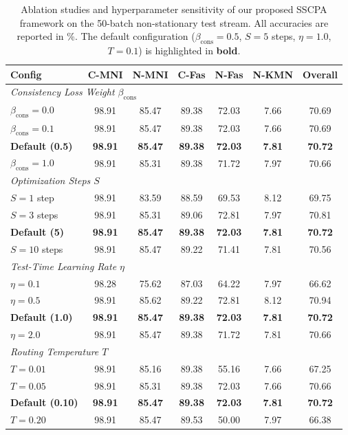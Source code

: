 \documentclass{article}
\theoremstyle{plain}
\theoremstyle{definition}
\theoremstyle{remark}
\begin{document}
\begin{table}[t]
\centering
\small
\setlength{\tabcolsep}{6.0pt}
\caption{Ablation studies and hyperparameter sensitivity of our proposed SSCPA framework on the 50-batch non-stationary test stream. All accuracies are reported in \%. The default configuration ($\beta_{\text{cons}} = 0.5$, $S = 5$ steps, $\eta = 1.0$, $T = 0.1$) is highlighted in \textbf{bold}.}
\label{table:ablation_results}
\vskip 0.1in
\begin{tabular}{lcccccc}
\toprule
\textbf{Config} & \textbf{C-MNI} & \textbf{N-MNI} & \textbf{C-Fas} & \textbf{N-Fas} & \textbf{N-KMN} & \textbf{Overall} \\
\midrule
\multicolumn{7}{l}{\textit{Consistency Loss Weight $\beta_{\text{cons}}$}} \\
$\beta_{\text{cons}} = 0.0$ & 98.91 & 85.47 & 89.38 & 72.03 & 7.66 & 70.69 \\
$\beta_{\text{cons}} = 0.1$ & 98.91 & 85.47 & 89.38 & 72.03 & 7.66 & 70.69 \\
\textbf{Default (0.5)} & \textbf{98.91} & \textbf{85.47} & \textbf{89.38} & \textbf{72.03} & \textbf{7.81} & \textbf{70.72} \\
$\beta_{\text{cons}} = 1.0$ & 98.91 & 85.31 & 89.38 & 71.72 & 7.97 & 70.66 \\
\midrule
\multicolumn{7}{l}{\textit{Optimization Steps $S$}} \\
$S = 1$ step & 98.91 & 83.59 & 88.59 & 69.53 & 8.12 & 69.75 \\
$S = 3$ steps & 98.91 & 85.31 & 89.06 & 72.81 & 7.97 & 70.81 \\
\textbf{Default (5)} & \textbf{98.91} & \textbf{85.47} & \textbf{89.38} & \textbf{72.03} & \textbf{7.81} & \textbf{70.72} \\
$S = 10$ steps & 98.91 & 85.47 & 89.22 & 71.41 & 7.81 & 70.56 \\
\midrule
\multicolumn{7}{l}{\textit{Test-Time Learning Rate $\eta$}} \\
$\eta = 0.1$ & 98.28 & 75.62 & 87.03 & 64.22 & 7.97 & 66.62 \\
$\eta = 0.5$ & 98.91 & 85.62 & 89.22 & 72.81 & 8.12 & 70.94 \\
\textbf{Default (1.0)} & \textbf{98.91} & \textbf{85.47} & \textbf{89.38} & \textbf{72.03} & \textbf{7.81} & \textbf{70.72} \\
$\eta = 2.0$ & 98.91 & 85.47 & 89.38 & 71.72 & 7.81 & 70.66 \\
\midrule
\multicolumn{7}{l}{\textit{Routing Temperature $T$}} \\
$T = 0.01$ & 98.91 & 85.16 & 89.38 & 55.16 & 7.66 & 67.25 \\
$T = 0.05$ & 98.91 & 85.31 & 89.38 & 72.03 & 7.66 & 70.66 \\
\textbf{Default (0.10)} & \textbf{98.91} & \textbf{85.47} & \textbf{89.38} & \textbf{72.03} & \textbf{7.81} & \textbf{70.72} \\
$T = 0.20$ & 98.91 & 85.47 & 89.53 & 50.00 & 7.97 & 66.38 \\
\bottomrule
\end{tabular}
\end{table}
\end{document}
